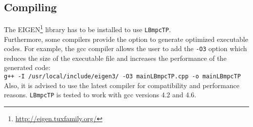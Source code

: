 \documentclass[letter]{article}
\begin{document}
\begin{sffamily}
\subsection{Compiling}
The EIGEN\footnote{\url{http://eigen.tuxfamily.org/}} library has to be installed to use \texttt{LBmpcTP}.\\

\noindent
Furthermore, some compilers provide the option to generate optimized executable codes. For example, the gcc compiler allows the user to add the \texttt{-O3} option which  reduces the size of the executable file and increases the performance of the generated code: \\
\noindent
\texttt{g++ -I /usr/local/include/eigen3/ -O3 mainLBmpcTP.cpp -o mainLBmpcTP} \\

\noindent
Also, it is advised to use the latest compiler for compatibility and performance reasons. \texttt{LBmpcTP} is tested to work with gcc versions 4.2 and 4.6.


\end{sffamily}
\end{document}
